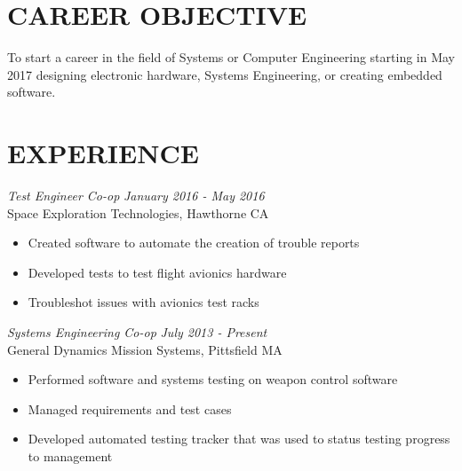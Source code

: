 \documentclass[line,margin]{res}
\begin{document}
\setlength\columnsep{-30pt}
\address{CRC3510@RIT.EDU}
\address{(413) 376-5034}
 
\begin{resume}
 \setlength\multicolsep{2pt}

\section{CAREER OBJECTIVE}   
	To start a career in the field of Systems or Computer Engineering starting in May 2017 designing electronic hardware, Systems Engineering, or creating embedded software.
 
\section{EXPERIENCE} 
{\sl  Test Engineer Co-op} \hfill {\sl January 2016 - May 2016}\\
	Space Exploration Technologies, Hawthorne CA
	\begin{itemize}  \itemsep -2pt %
		\item Created software to automate the creation of trouble reports
		\item Developed tests to test flight avionics hardware
		\item Troubleshot issues with avionics test racks
	\end{itemize}
	\vspace{-5pt}
{\sl Systems Engineering Co-op} \hfill {\sl July 2013 - Present }\\
	General Dynamics Mission Systems, Pittsfield MA
	\begin{itemize}  \itemsep -2pt %
		\item Performed software and systems testing on weapon control software
		\item Managed requirements and test cases
		\item Developed automated testing tracker that was used to status testing progress to management
	\end{itemize}
 

\end{resume}
\end{document}
